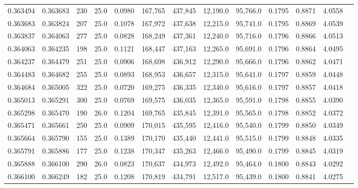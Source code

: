 \begin{tabular}{rrrrrrrrrrrrr}
0.363494 & 0.363683 &   230 & 25.0 &                                     0.0980 & 167,765 & 437,845 &  12,190.0 &  95,766.0 & 0.1795 & 0.8871 & 4.0558 \\
0.363683 & 0.363824 &   207 & 25.0 &                                     0.1078 & 167,972 & 437,638 &  12,215.0 &  95,741.0 & 0.1795 & 0.8869 & 4.0539 \\
0.363837 & 0.364063 &   277 & 25.0 &                                     0.0828 & 168,249 & 437,361 &  12,240.0 &  95,716.0 & 0.1796 & 0.8866 & 4.0513 \\
0.364063 & 0.364235 &   198 & 25.0 &                                     0.1121 & 168,447 & 437,163 &  12,265.0 &  95,691.0 & 0.1796 & 0.8864 & 4.0495 \\
0.364237 & 0.364479 &   251 & 25.0 &                                     0.0906 & 168,698 & 436,912 &  12,290.0 &  95,666.0 & 0.1796 & 0.8862 & 4.0471 \\
0.364483 & 0.364682 &   255 & 25.0 &                                     0.0893 & 168,953 & 436,657 &  12,315.0 &  95,641.0 & 0.1797 & 0.8859 & 4.0448 \\
0.364684 & 0.365005 &   322 & 25.0 &                                     0.0720 & 169,275 & 436,335 &  12,340.0 &  95,616.0 & 0.1797 & 0.8857 & 4.0418 \\
0.365013 & 0.365291 &   300 & 25.0 &                                     0.0769 & 169,575 & 436,035 &  12,365.0 &  95,591.0 & 0.1798 & 0.8855 & 4.0390 \\
0.365298 & 0.365470 &   190 & 26.0 &                                     0.1204 & 169,765 & 435,845 &  12,391.0 &  95,565.0 & 0.1798 & 0.8852 & 4.0372 \\
0.365471 & 0.365661 &   250 & 25.0 &                                     0.0909 & 170,015 & 435,595 &  12,416.0 &  95,540.0 & 0.1799 & 0.8850 & 4.0349 \\
0.365664 & 0.365790 &   155 & 25.0 &                                     0.1389 & 170,170 & 435,440 &  12,441.0 &  95,515.0 & 0.1799 & 0.8848 & 4.0335 \\
0.365791 & 0.365886 &   177 & 25.0 &                                     0.1238 & 170,347 & 435,263 &  12,466.0 &  95,490.0 & 0.1799 & 0.8845 & 4.0319 \\
0.365888 & 0.366100 &   290 & 26.0 &                                     0.0823 & 170,637 & 434,973 &  12,492.0 &  95,464.0 & 0.1800 & 0.8843 & 4.0292 \\
0.366100 & 0.366249 &   182 & 25.0 &                                     0.1208 & 170,819 & 434,791 &  12,517.0 &  95,439.0 & 0.1800 & 0.8841 & 4.0275 \\

\end{tabular}
